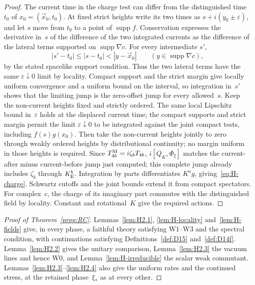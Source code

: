 \begin{proof}
The current time in the charge test can differ from the distinguished time $t_0$ of $x_0=(\vec x_0,t_0)$. At fixed strict heights write its two times as $s+i(y_0\pm\varepsilon)$, and let $s$ move from $t_0$ to a point of $\operatorname{supp}f$. Conservation expresses the derivative in~$s$ of the difference of the two integrated currents as the difference of the lateral terms supported on $\operatorname{supp}\nabla c$. For every intermediate $s'$,
\[
 |s'-t_0|\le |s-t_0|<|y-\vec x_0|
 \qquad(y\in\operatorname{supp}\nabla c),
\]
by the stated spacelike support condition. Thus the two lateral terms have the same $\varepsilon\downarrow0$ limit by locality. Compact support and the strict margin give locally uniform convergence and a uniform bound on the interval, so integration in~$s'$ shows that the limiting jump is the zero-offset jump for every allowed~$s$. Keep the non-current heights fixed and strictly ordered. The same local Lipschitz bound in~$\varepsilon$ holds at the displaced current time; the compact supports and strict margin permit the limit $\varepsilon\downarrow0$ to be integrated against the joint compact tests, including $f(s)g(x_0)$. Then take the non-current heights jointly to zero through weakly ordered heights by distributional continuity; no margin uniform in those heights is required. Since $T^{\rm M}_{4b}=i\zeta_bT_{4b}$, $i[Q_K,\Phi_\xi]$ matches the current-after minus current-before jump just computed; this complete jump already includes $\zeta_b$ through $K_{\rm E}^b$. Integration by parts differentiates $K^ag$, giving~\eqref{eq:H-charge}. Schwartz cutoffs and the joint bounds extend it from compact spectators. For complex~$c$, the charge of its imaginary part commutes with the distinguished field by locality. Constant and rotational~$K$ give the required actions.
\end{proof}

\begin{proof}[Proof of Theorem~\ref{prop:RC}]
Lemmas~\ref{lem:H2.1}, \ref{lem:H-locality} and~\ref{lem:H-fields} give, in every phase, a faithful theory satisfying W1--W3 and the spectral condition, with continuations satisfying Definitions~\ref{def:D15} and~\ref{def:D14f}. Lemma~\ref{lem:H2.2} gives the unitary comparison, Lemma~\ref{lem:H2.3} the vacuum lines and hence W0, and Lemma~\ref{lem:H-irreducible} the scalar weak commutant. Lemmas~\ref{lem:H2.3}--\ref{lem:H2.4} also give the uniform rates and the continued stress, at the retained phase~$\xi_*$ as at every other.
\end{proof}
